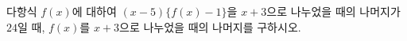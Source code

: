 다항식 $f(x)$에 대하여 $(x-5)\{f(x)-1\}$을 $x+3$으로 나누었을 때의 나머지가 $24$일 때, $f(x)$를 $x+3$으로 나누었을 때의 나머지를 구하시오.
